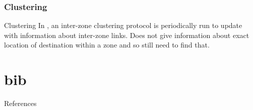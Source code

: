 \documentclass{beamer}
\begin{document}

\section{Clustering}

\begin{frame}{Clustering}
In \cite{779923}, an inter-zone clustering protocol is periodically run to update with information about inter-zone links.
Does not give information about exact location of destination within a zone and so still need to find that.
\end{frame}

\part{bib}

\begin{frame}{References}


\end{frame}
\end{document}
